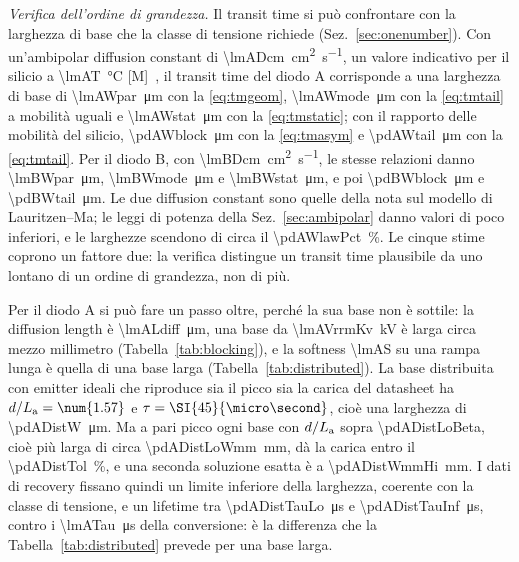 \documentclass[10pt,a4paper]{scrartcl}
\let\newcommand\pdvaluedefine
\newcommand{\La}{L_\mathrm{a}}
\begin{document}
\emph{Verifica dell'ordine di grandezza.} Il transit time si può confrontare con la larghezza di base che la classe di tensione richiede (Sez.~\ref{sec:onenumber}). Con un'ambipolar diffusion constant di \SI{\lmADcm}{\centi\metre\squared\per\second}, un valore indicativo per il silicio a \SI{\lmAT}{\celsius} [M]~\cite{lutz}, il transit time del diodo A corrisponde a una larghezza di base di \SI{\lmAWpar}{\micro\metre} con la \eqref{eq:tmgeom}, \SI{\lmAWmode}{\micro\metre} con la \eqref{eq:tmtail} a mobilità uguali e \SI{\lmAWstat}{\micro\metre} con la \eqref{eq:tmstatic}; con il rapporto delle mobilità del silicio, \SI{\pdAWblock}{\micro\metre} con la \eqref{eq:tmasym} e \SI{\pdAWtail}{\micro\metre} con la \eqref{eq:tmtail}. Per il diodo B, con \SI{\lmBDcm}{\centi\metre\squared\per\second}, le stesse relazioni danno \SI{\lmBWpar}{\micro\metre}, \SI{\lmBWmode}{\micro\metre} e \SI{\lmBWstat}{\micro\metre}, e poi \SI{\pdBWblock}{\micro\metre} e \SI{\pdBWtail}{\micro\metre}. Le due diffusion constant sono quelle della nota sul modello di Lauritzen--Ma; le leggi di potenza della Sez.~\ref{sec:ambipolar} danno valori di poco inferiori, e le larghezze scendono di circa il \SI{\pdAWlawPct}{\percent}. Le cinque stime coprono un fattore due: la verifica distingue un transit time plausibile da uno lontano di un ordine di grandezza, non di più.

Per il diodo A si può fare un passo oltre, perché la sua base non è sottile: la diffusion length è \SI{\lmALdiff}{\micro\metre}, una base da \SI{\lmAVrrmKv}{\kilo\volt} è larga circa mezzo millimetro (Tabella~\ref{tab:blocking}), e la softness \num{\lmAS} su una rampa lunga è quella di una base larga (Tabella~\ref{tab:distributed}). La base distribuita con emitter ideali che riproduce sia il picco sia la carica del datasheet ha $d/\La = \num{\pdADistBeta}$ e $\tau = \SI{\pdADistTau}{\micro\second}$, cioè una larghezza di \SI{\pdADistW}{\micro\metre}. Ma a pari picco ogni base con $d/\La$ sopra \num{\pdADistLoBeta}, cioè più larga di circa \SI{\pdADistLoWmm}{\milli\metre}, dà la carica entro il \SI{\pdADistTol}{\percent}, e una seconda soluzione esatta è a \SI{\pdADistWmmHi}{\milli\metre}. I dati di recovery fissano quindi un limite inferiore della larghezza, coerente con la classe di tensione, e un lifetime tra \SI{\pdADistTauLo}{\micro\second} e \SI{\pdADistTauInf}{\micro\second}, contro i \SI{\lmATau}{\micro\second} della conversione: è la differenza che la Tabella~\ref{tab:distributed} prevede per una base larga.
\end{document}
